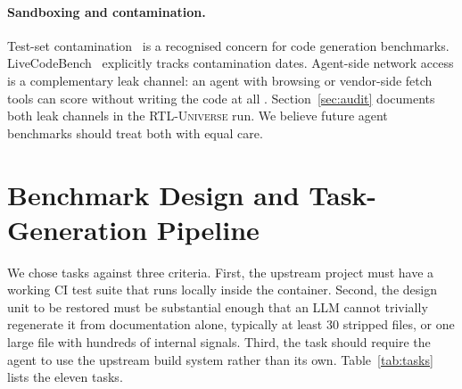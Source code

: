 \documentclass{article}
\begin{document}
\paragraph{Sandboxing and contamination.}
Test-set contamination~\citep{timetravel} is a recognised concern for code
generation benchmarks. LiveCodeBench~\citep{livecodebench} explicitly tracks
contamination dates. Agent-side network access is a complementary leak channel: an agent
with browsing or vendor-side fetch tools can score without writing the code at all
\citep{anthropic2024computeruse}. Section~\ref{sec:audit} documents both leak channels in
the \textsc{RTL-Universe} run. We believe future agent benchmarks should treat both with
equal care.

\section{Benchmark Design and Task-Generation Pipeline}
\label{sec:bench}

We chose tasks against three criteria. First, the upstream project must have a working CI
test suite that runs locally inside the container. Second, the design unit to be restored
must be substantial enough that an LLM cannot trivially regenerate it from documentation
alone, typically at least 30 stripped files, or one large file with hundreds of internal
signals. Third, the task should require the agent to use the upstream build system rather
than its own. Table~\ref{tab:tasks} lists the eleven tasks.
\end{document}
